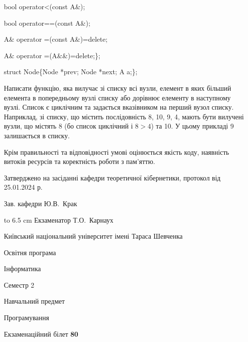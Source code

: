 \documentclass[12pt, ukrainian]{article}
\begin{document}
{\quad  bool operator<(const A\&); 

\quad  bool operator==(const A\&); 

\quad A\& operator =(const A\&)=delete; 

\quad  A\& operator =(A\&\&)=delete;\};

struct Node\{Node *prev; Node *next; A a;\};

Написати функцію, яка вилучає зі списку всі вузли, елемент в яких більший елемента в попередньому вузлі списку або дорівнює елементу в наступному вузлі. Список є циклічним та задається вказівником на перший вузол списку. Наприклад, зі списку, що містить послідовність 8, 10, 9, 4, мають бути вилучені вузли, що містять 8 (бо список циклічний і $8>4$) та 10. У цьому прикладі 9 залишається в списку.

Крім правильності та відповідності умові оцінюється якість коду, наявність витоків ресурсів та коректність роботи з пам'яттю. 

}
{\smallskip\smallskip \begin {scriptsize} Затверджено на засіданні кафедри теоретичної кібернетики, протокол   від   25.01.2024 р.\par\smallskip\smallskip\smallskip\smallskip
{\parbox {6.5 cm} {Зав. кафедри \dotfill Ю.В.~Крак}}\hspace {0.7cm} {\hbox to 6.5 cm { Екзаменатор \dotfill Т.О.~Карнаух}} \end{scriptsize}}
\newpage
{{\begin {scriptsize}\par
{ \center  Київський національний університет імені Тараса Шевченка \par}
{\parbox {5 cm}{Освітня програма \hfill}{\parbox {7 cm}{Інформатика\hfill}}\parbox {6 cm}{\hfill Семестр 2}}\par
{\parbox {5 cm} {Навчальний предмет \hfill}\parbox {7 cm}{Програмування \hfill}\parbox {6cm}{\hfill}\par}\vspace{-15pt} \end{scriptsize}}{\center Екзаменаційний білет \No \textbf { 80 }\par}}
\end{document}
